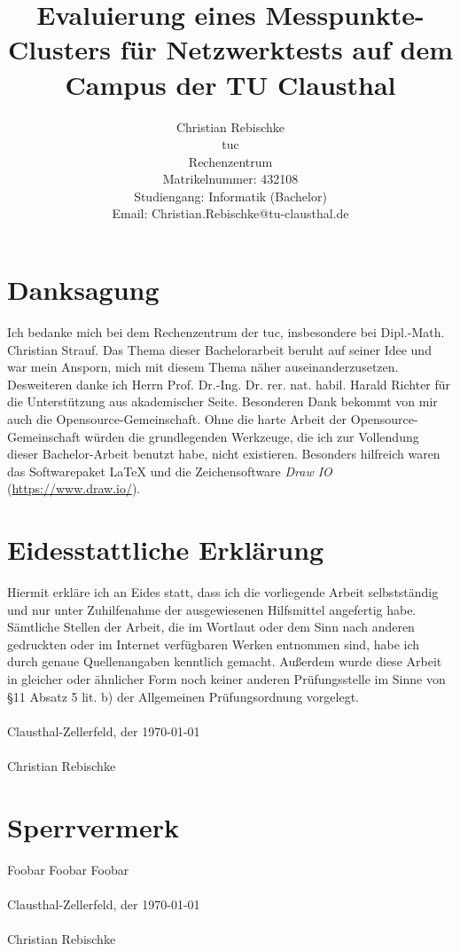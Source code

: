\documentclass[titlepage]{report}
\title{Evaluierung eines Messpunkte-Clusters für Netzwerktests auf dem
Campus der TU Clausthal}
\author{Christian Rebischke\\
\gls{tuc}\\
Rechenzentrum\\
Matrikelnummer: 432108 \\
Studiengang: Informatik (Bachelor) \\
Email: Christian.Rebischke@tu-clausthal.de}
\begin{document}
\maketitle
\chapter*{Danksagung}
Ich bedanke mich bei dem Rechenzentrum der \gls{tuc}, insbesondere bei
Dipl.\hyp{}Math. Christian Strauf. Das Thema dieser Bachelorarbeit
beruht auf seiner Idee und war mein Ansporn, mich mit diesem Thema näher
auseinanderzusetzen. Desweiteren danke ich Herrn Prof. Dr.\hyp{}Ing. Dr.
rer. nat. habil. Harald Richter für die Unterstützung aus akademischer
Seite. Besonderen Dank bekommt von mir auch die
Opensource\hyp{}Gemeinschaft.  Ohne die harte Arbeit der
Opensource\hyp{}Gemeinschaft würden die grundlegenden Werkzeuge, die
ich zur Vollendung dieser Bachelor-Arbeit benutzt habe, nicht
existieren. Besonders hilfreich waren das Softwarepaket \LaTeX{} und die
Zeichensoftware \emph{Draw IO} (\url{https://www.draw.io/}).
\chapter*{Eidesstattliche Erklärung}
Hiermit erkläre ich an Eides statt, dass ich die vorliegende Arbeit
selbstständig und nur unter Zuhilfenahme der ausgewiesenen Hilfsmittel
angefertig habe. Sämtliche Stellen der Arbeit, die im Wortlaut oder dem
Sinn nach anderen gedruckten oder im Internet verfügbaren Werken
entnommen sind, habe ich durch genaue Quellenangaben kenntlich gemacht.
Außerdem wurde diese Arbeit in gleicher oder ähnlicher Form noch keiner
anderen Prüfungsstelle im Sinne von \S 11 Absatz 5 lit. b) der
Allgemeinen Prüfungsordnung vorgelegt.
\\
\\
Clausthal-Zellerfeld, der \today
\\
\\
Christian Rebischke
\chapter*{Sperrvermerk}
Foobar Foobar Foobar
\\
\\
Clausthal-Zellerfeld, der \today
\\
\\
Christian Rebischke
\tableofcontents
\end{document}

